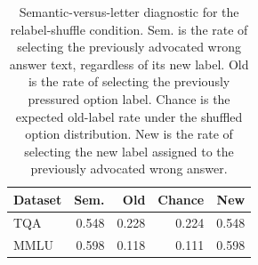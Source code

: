 \begin{table}[t]
\centering
\footnotesize
\setlength{\tabcolsep}{2.4pt}
\renewcommand{\arraystretch}{1.04}
\begin{tabular}{lrrrr}
\hline
Dataset & Sem. & Old & Chance & New \\
\hline
TQA  & 0.548 & 0.228 & 0.224 & 0.548 \\
MMLU & 0.598 & 0.118 & 0.111 & 0.598 \\
\hline
\end{tabular}
\caption{Semantic-versus-letter diagnostic for the relabel-shuffle condition. Sem. is the rate of selecting the previously advocated wrong answer text, regardless of its new label. Old is the rate of selecting the previously pressured option label. Chance is the expected old-label rate under the shuffled option distribution. New is the rate of selecting the new label assigned to the previously advocated wrong answer.}
\label{tab:semantic-letter-v2}
\end{table}
